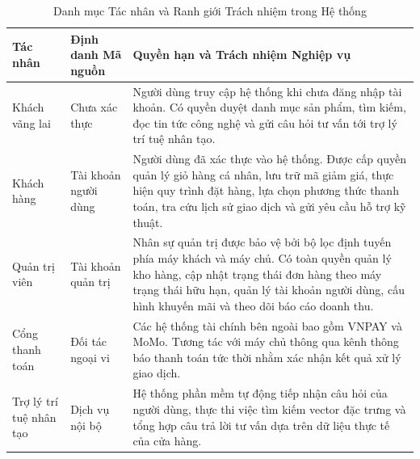 \begin{table}[H]
\centering
\caption{Danh mục Tác nhân và Ranh giới Trách nhiệm trong Hệ thống}
\label{tab:actors}
\begin{tabularx}{\textwidth}{p{3.5cm}p{3cm}X}
\toprule
\textbf{Tác nhân} & \textbf{Định danh Mã nguồn} & \textbf{Quyền hạn và Trách nhiệm Nghiệp vụ} \\
\midrule
Khách vãng lai & Chưa xác thực & Người dùng truy cập hệ thống khi chưa đăng nhập tài khoản. Có quyền duyệt danh mục sản phẩm, tìm kiếm, đọc tin tức công nghệ và gửi câu hỏi tư vấn tới trợ lý trí tuệ nhân tạo. \\
\addlinespace
Khách hàng & Tài khoản người dùng & Người dùng đã xác thực vào hệ thống. Được cấp quyền quản lý giỏ hàng cá nhân, lưu trữ mã giảm giá, thực hiện quy trình đặt hàng, lựa chọn phương thức thanh toán, tra cứu lịch sử giao dịch và gửi yêu cầu hỗ trợ kỹ thuật. \\
\addlinespace
Quản trị viên & Tài khoản quản trị & Nhân sự quản trị được bảo vệ bởi bộ lọc định tuyến phía máy khách và máy chủ. Có toàn quyền quản lý kho hàng, cập nhật trạng thái đơn hàng theo máy trạng thái hữu hạn, quản lý tài khoản người dùng, cấu hình khuyến mãi và theo dõi báo cáo doanh thu. \\
\addlinespace
Cổng thanh toán & Đối tác ngoại vi & Các hệ thống tài chính bên ngoài bao gồm VNPAY và MoMo. Tương tác với máy chủ thông qua kênh thông báo thanh toán tức thời nhằm xác nhận kết quả xử lý giao dịch. \\
\addlinespace
Trợ lý trí tuệ nhân tạo & Dịch vụ nội bộ & Hệ thống phần mềm tự động tiếp nhận câu hỏi của người dùng, thực thi việc tìm kiếm vector đặc trưng và tổng hợp câu trả lời tư vấn dựa trên dữ liệu thực tế của cửa hàng. \\
\bottomrule
\end{tabularx}
\end{table}

